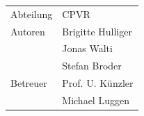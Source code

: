 \begin{titlepage}
\begin{flushleft}
\begin{tabular}{p{5cm}p{8cm}}
\Large{Abteilung} & \Large{CPVR}\\[0.2cm]
\Large{Autoren} & \Large{Brigitte Hulliger}\\[0.2cm]
& \Large{Jonas Walti}\\[0.2cm]
& \Large{Stefan Broder}\\[0.2cm]
\Large{Betreuer} & \Large{Prof. U. K\"unzler} \\[0.2cm]
& \Large{Michael Luggen }\\[0.2cm]
\end{tabular} 

 \end{flushleft}
\end{titlepage}
